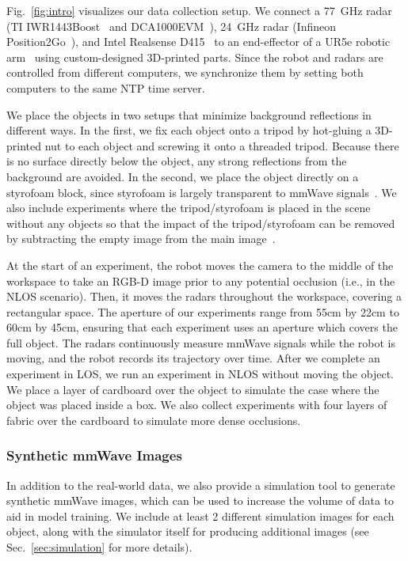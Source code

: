 Fig.~\ref{fig:intro} visualizes our data collection setup. We connect a 77~GHz radar (TI IWR1443Boost~\cite{ti_iwr1443} and DCA1000EVM~\cite{dca1000evm}), 24~GHz radar (Infineon Position2Go~\cite{position2go}), and Intel Realsense D415~\cite{realsense} to an end-effector of a UR5e robotic arm~\cite{UR5} using custom-designed 3D-printed parts. Since the robot and radars are controlled from different computers, we synchronize them by setting both computers to the same NTP time server.

We place the objects in two setups that minimize background reflections in different ways. In the first, we fix each object onto a tripod by hot-gluing a 3D-printed nut to each object and screwing it onto a threaded tripod. Because there is no surface directly below the object, any strong reflections from the background are avoided. In the second, we place the object directly on a styrofoam block, since styrofoam is largely transparent to mmWave signals~\cite{ti_styrofoam}. We also include experiments where the tripod/styrofoam is placed in the scene without any objects so that the impact of the tripod/styrofoam can be removed by subtracting the empty image from the main image~\cite{RFCapture}. 

At the start of an experiment, the robot moves the camera to the middle of the workspace to take an RGB-D image prior to any potential occlusion (i.e., in the NLOS scenario). Then, it moves the radars throughout the workspace, covering a rectangular space. The aperture of our experiments range from 55cm by 22cm to 60cm by 45cm, ensuring that each experiment uses an aperture which covers the full object. The radars continuously measure mmWave signals while the robot is moving, and the robot records its trajectory over time. After we complete an experiment in LOS, we run an experiment in NLOS without moving the object. We place a layer of cardboard over the object to simulate the case where the object was placed inside a box. We also collect experiments with four layers of fabric over the cardboard to simulate more dense occlusions.


\subsubsection{Synthetic mmWave Images}
In addition to the real-world data, we also provide a simulation tool to generate synthetic mmWave images, which can be used to increase the volume of data to aid in model training. We include at least 2 different simulation images for each object, along with the simulator itself for producing additional images (see Sec.~\ref{sec:simulation} for more details). 


